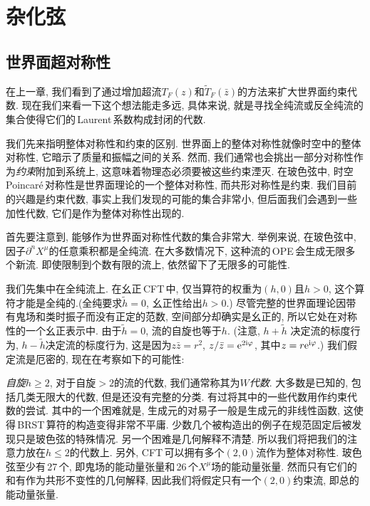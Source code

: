 \chapter{杂化弦} \label{cha:11}

\section{世界面超对称性} \label{sec:11.1}

在上一章, 我们看到了通过增加超流$ T_{F}(z) $和$ \tilde{T}_{F}(\bar{z}) $的方法来扩大世界面约束代数. 现在我们来看一下这个想法能走多远, 具体来说, 就是寻找全纯流或反全纯流的集合使得它们的\,Laurent\,系数构成封闭的代数.

我们先来指明整体对称性和约束的区别. 世界面上的整体对称性就像时空中的整体对称性, 它暗示了质量和振幅之间的关系. 然而, 我们通常也会挑出一部分对称性作为{\emph{约束}}附加到系统上, 这意味着物理态必须要被这些约束湮灭. 在玻色弦中, 时空\,Poincar\'{e}\,对称性是世界面理论的一个整体对称性, 而共形对称性是约束. 我们目前的兴趣是约束代数, 事实上我们发现的可能的集合非常小, 但后面我们会遇到一些加性代数, 它们是作为整体对称性出现的. 

首先要注意到, 能够作为世界面对称性代数的集合非常大. 举例来说, 在玻色弦中, 因子$ \partial^{n}X^{\mu} $的任意乘积都是全纯流. 在大多数情况下, 这种流的\,OPE\,会生成无限多个新流. 即使限制到个数有限的流上, 依然留下了无限多的可能性.

我们先集中在全纯流上. 在幺正\,CFT\,中, 仅当算符的权重为$ (h,0) $且$ h>0$, 这个算符才能是全纯的.(全纯要求$ \tilde{h}=0$, 幺正性给出$ h>0$.) 尽管完整的世界面理论因带有鬼场和类时振子而没有正定的范数, 空间部分却确实是幺正的, 所以它处在对称性的一个幺正表示中. 由于$ \tilde{h}=0$, 流的自旋也等于$ h$. (注意, $h+\tilde{h}$ 决定流的标度行为, $h-\tilde{h} $决定流的标度行为, 这是因为$ z\bar{z}=r^{2}$, $ z/\bar{z}=\mathrm{e}^{2\mathrm{i}\varphi}$, 其中$ z=r\mathrm{e}^{\mathrm{i}\varphi}$.) 我们假定流是厄密的, 现在在考察如下的可能性:

{\emph{自旋}}$ h\geq 2$, 对于自旋$ >2 $的流的代数, 我们通常称其为$ W ${\emph{代数}}. 大多数是已知的, 包括几类无限大的代数, 但是还没有完整的分类. 有过将其中的一些代数用作约束代数的尝试. 其中的一个困难就是, 生成元的对易子一般是生成元的非线性函数, 这使得\,BRST\,算符的构造变得非常不平庸. 少数几个被构造出的例子在规范固定后被发现只是玻色弦的特殊情况. 另一个困难是几何解释不清楚. 所以我们将把我们的注意力放在$ h\leq 2 $的代数上. 另外, CFT\,可以拥有多个$ (2,0) $流作为整体对称性. 玻色弦至少有\,27\,个, 即鬼场的能动量张量和\,26\,个$ X^{\mu} $场的能动量张量. 然而只有它们的和有作为共形不变性的几何解释, 因此我们将假定只有一个$(2,0)$约束流, 即总的能动量张量.

